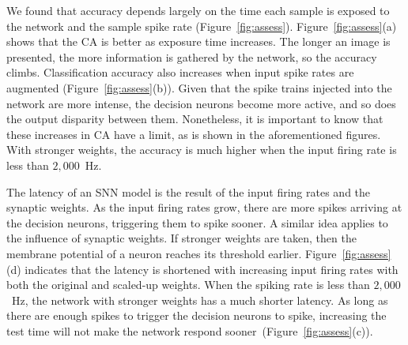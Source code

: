 \documentclass{frontiersENG} %
\begin{document}
We found that accuracy depends largely on the time each sample is exposed to the network and the sample spike rate (Figure~\ref{fig:assess}).
Figure~\ref{fig:assess}(a) shows that the CA is better as exposure time increases. The longer an image is presented, the more information is gathered by the network, so the accuracy climbs.
Classification accuracy also increases when input spike rates are augmented (Figure~\ref{fig:assess}(b)).
Given that the spike trains injected into the network are more intense, the decision neurons become more active, and so does the output disparity between them.
Nonetheless, it is important to know that these increases in CA have a limit, as is shown in the aforementioned figures.
With stronger weights, the accuracy is much higher when the input firing rate is less than $2,000$~Hz.


The latency of an SNN model is the result of the input firing rates and the synaptic weights.
As the input firing rates grow, there are more spikes arriving at the decision neurons, triggering them to spike sooner.
A similar idea applies to the influence of synaptic weights.
If stronger weights are taken, then the membrane potential of a neuron reaches its threshold earlier.
Figure~\ref{fig:assess}(d) indicates that the latency is shortened with increasing input firing rates with both the original and scaled-up weights.
When the spiking rate is less than $2,000$~Hz, the network with stronger weights has a much shorter latency.
As long as there are enough spikes to trigger the decision neurons to spike, increasing the test time will not make the network respond sooner~(Figure~\ref{fig:assess}(c)).
\end{document}
